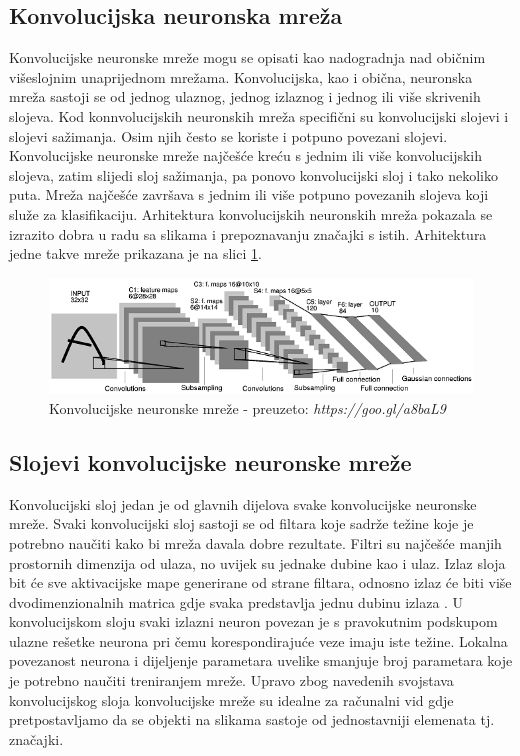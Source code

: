 \documentclass[times, utf8, zavrsni, numeric]{fer}
\begin{document}
\subsection{Konvolucijska neuronska mreža}

Konvolucijske neuronske mreže mogu se opisati kao nadogradnja nad običnim višeslojnim unaprijednom mrežama. Konvolucijska, kao i obična, neuronska mreža sastoji se od jednog ulaznog, jednog izlaznog i jednog ili više skrivenih slojeva. Kod konnvolucijskih neuronskih mreža specifični su konvolucijski slojevi i slojevi sažimanja. Osim njih često se koriste i potpuno povezani slojevi. Konvolucijske neuronske mreže najčešće kreću s jednim ili više konvolucijskih slojeva, zatim slijedi sloj sažimanja, pa ponovo konvolucijski sloj i tako nekoliko puta. Mreža najčešće završava s jednim ili više potpuno povezanih slojeva koji služe za klasifikaciju. Arhitektura konvolucijskih neuronskih mreža pokazala se izrazito dobra u radu sa slikama i prepoznavanju značajki s istih. Arhitektura jedne takve mreže prikazana je na slici \ref{fig:conv}.

\begin{figure}[htb]
    \centering
    \includegraphics[width=13cm]{images/conv.png}
    \caption{Konvolucijske neuronske mreže - preuzeto: \emph{https://goo.gl/a8baL9}}
    \label{fig:conv}
\end{figure}

\subsection{Slojevi konvolucijske neuronske mreže}

Konvolucijski sloj jedan je od glavnih dijelova svake konvolucijske neuronske mreže. Svaki konvolucijski sloj sastoji se od filtara koje sadrže težine koje je potrebno naučiti kako bi mreža davala dobre rezultate. Filtri su najčešće manjih prostornih dimenzija od ulaza, no uvijek su jednake dubine kao i ulaz. Izlaz sloja bit će sve aktivacijske mape generirane od strane filtara, odnosno izlaz će biti više dvodimenzionalnih matrica gdje svaka predstavlja jednu dubinu izlaza \citep{kopljar}. U konvolucijskom sloju svaki izlazni neuron povezan je s pravokutnim podskupom ulazne rešetke neurona pri čemu korespondirajuće veze imaju iste težine. Lokalna povezanost neurona i dijeljenje parametara uvelike smanjuje broj parametara koje je potrebno naučiti treniranjem mreže. Upravo zbog navedenih svojstava konvolucijskog sloja konvolucijske mreže su idealne za računalni vid gdje pretpostavljamo da se objekti na slikama sastoje od jednostavniji elemenata tj. značajki.
\end{document}
